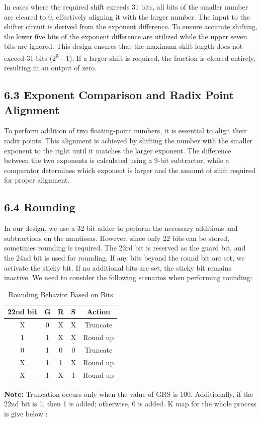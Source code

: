 \documentclass{article}
\begin{document}
In cases where the required shift exceeds 31 bits, all bits of the smaller number are cleared to 0, effectively aligning it with the larger number. The input to the shifter circuit is derived from the exponent difference. To ensure accurate shifting, the lower five bits of the exponent difference are utilized while the upper seven bits are ignored. This design ensures that the maximum shift length does not exceed 31 bits (2\textsuperscript{5} - 1). If a larger shift is required, the fraction is cleared entirely, resulting in an output of zero.



\subsection*{6.3 Exponent Comparison and Radix Point Alignment}
To perform addition of two floating-point numbers, it is essential to align their radix points. This alignment is achieved by shifting the number with the smaller exponent to the right until it matches the larger exponent. The difference between the two exponents is calculated using a 9-bit subtractor, while a comparator determines which exponent is larger and the amount of shift required for proper alignment.
\subsection*{6.4 Rounding}
In our design, we use a 32-bit adder to perform the necessary additions and subtractions on the mantissas. However, since only 22 bits can be stored, sometimes rounding is required. The 23rd bit is reserved as the guard bit, and the 24nd bit is used for rounding. If any bits beyond the round bit are set, we activate the sticky bit. If no additional bits are set, the sticky bit remains inactive. We need to consider the following scenarios when performing rounding:

\begin{table}[h!]
\centering
\begin{tabular}{|c|c|c|c|c|}
\hline
\rowcolor{gray!20} \textbf{22nd bit} & \textbf{G} & \textbf{R} & \textbf{S} & \textbf{Action} \\ \hline
\rowcolor{white} X & 0 & X & X & Truncate \\ \hline
\rowcolor{gray!10} 1 & 1 & X & X & Round up \\ \hline
\rowcolor{white} 0 & 1 & 0 & 0 & Truncate \\ \hline
\rowcolor{gray!10} X & 1 & 1 & X & Round up \\ \hline
\rowcolor{gray!10} X & 1 & X & 1 & Round up \\ \hline
\end{tabular}
\caption{Rounding Behavior Based on Bits}
\end{table}
\noindent
\textbf{Note:} Truncation occurs only when the value of GRS is \( 100 \). Additionally, if the 22nd bit is 1, then 1 is added; otherwise, 0 is added.
K map for the whole process is give below :
\end{document}
